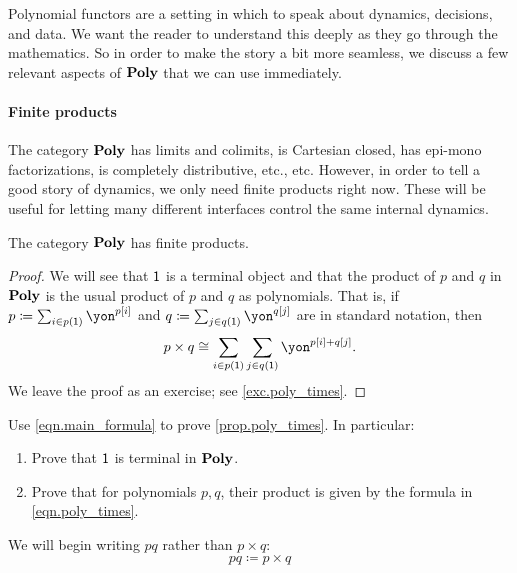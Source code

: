\documentclass[Book-Poly]{subfiles}
\begin{document}
Polynomial functors are a setting in which to speak about dynamics, decisions, and data. We want the reader to understand this deeply as they go through the mathematics. So in order to make the story a bit more seamless, we discuss a few relevant aspects of $\textbf{Poly}$ that we can use immediately.


\paragraph{Finite products}
The category $\textbf{Poly}$ has limits and colimits, is Cartesian closed, has epi-mono factorizations, is completely distributive, etc., etc. However, in order to tell a good story of dynamics, we only need finite products right now. These will be useful for letting many different interfaces control the same internal dynamics.

\begin{proposition}\label{prop.poly_times}
The category $\textbf{Poly}$ has finite products. 
\end{proposition}
\begin{proof}
We will see that $\textsf{1}$ is a terminal object and that the product of $p$ and $q$ in $\textbf{Poly}$ is the usual product of $p$ and $q$ as polynomials. That is, if $p\coloneqq\sum_{i\in p(\1)}\yon^{p[i]}$ and $q\coloneqq\sum_{j\in q(\1)}\yon^{q[j]}$ are in standard notation, then
\begin{equation}\label{eqn.poly_times}
p\times q\cong\sum_{i\in p(\1)}\sum_{j\in q(\1)}\yon^{p[i]+q[j]}.
\end{equation}
We leave the proof as an exercise; see \cref{exc.poly_times}.
\end{proof}

\begin{exercise}\label{exc.poly_times}
Use \cref{eqn.main_formula} to prove \cref{prop.poly_times}. In particular:
\begin{enumerate}
	\item Prove that $\textsf{1}$ is terminal in $\textbf{Poly}$.
	\item Prove that for polynomials $p,q$, their product is given by the formula in \eqref{eqn.poly_times}.
\qedhere
\end{enumerate}
\end{exercise}

We will begin writing $pq$ rather than $p\times q$:
\begin{equation} \tag{Notation}
pq\coloneqq p\times q
\end{equation}
\end{document}
